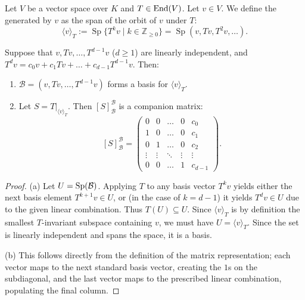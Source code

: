 \begin{definition}\label{def:T_cyclic_subspace}
  Let $V$ be a vector space over $K$ and $T \in \operatorname{End}(V)$. Let $v \in V$. We define the  generated by $v$ as the span of the orbit of $v$ under $T$:
  \[
  \langle v \rangle_T := \operatorname{Sp}\{T^k v \mid k \in \mathbb{Z}_{\ge 0}\} = \operatorname{Sp}(v, Tv, T^2v, \dots).
  \]
\end{definition}

\begin{lemma}\label{lemma:cyclic_basis_companion}
  Suppose that $v, Tv, \dots, T^{d-1}v$ ($d \ge 1$) are linearly independent, and $T^d v = c_0 v + c_1 Tv + \dots + c_{d-1}T^{d-1}v$. Then:
  \begin{enumerate}
    \item $\mathcal{B} = (v, Tv, \dots, T^{d-1}v)$ forms a basis for $\langle v \rangle_T$.
    \item Let $S = T|_{\langle v \rangle_T}$. Then $[S]_{\mathcal{B}}^{\mathcal{B}}$ is a companion matrix:
    \[
    [S]_{\mathcal{B}}^{\mathcal{B}} =
    \begin{pmatrix}
      0 & 0 & \dots & 0 & c_0 \\
      1 & 0 & \dots & 0 & c_1 \\
      0 & 1 & \dots & 0 & c_2 \\
      \vdots & \vdots & \ddots & \vdots & \vdots \\
      0 & 0 & \dots & 1 & c_{d-1}
    \end{pmatrix}.
    \]
  \end{enumerate}
\end{lemma}

\begin{proof}
  (a) Let $U = \operatorname{Sp}(\mathcal{B})$. Applying $T$ to any basis vector $T^k v$ yields either the next basis element $T^{k+1}v \in U$, or (in the case of $k=d-1$) it yields $T^d v \in U$ due to the given linear combination. Thus $T(U) \subseteq U$. Since $\langle v \rangle_T$ is by definition the smallest $T$-invariant subspace containing $v$, we must have $U = \langle v \rangle_T$. Since the set is linearly independent and spans the space, it is a basis.

  (b) This follows directly from the definition of the matrix representation; each vector maps to the next standard basis vector, creating the $1$s on the subdiagonal, and the last vector maps to the prescribed linear combination, populating the final column.
\end{proof}

